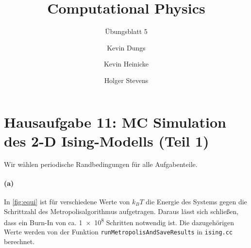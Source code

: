 \documentclass{scrartcl}
\author{Kevin Dungs \and Kevin Heinicke \and Holger Stevens}
\title{Computational Physics}
\subtitle{Übungsblatt 5}
\begin{document}
\maketitle

\section*{Hausaufgabe 11: MC Simulation des 2-D Ising-Modells (Teil 1)}
Wir wählen periodische Randbedingungen für alle Aufgabenteile.

\paragraph{(a)} In \autoref{fig:equi} ist für verschiedene Werte von $k_BT$ die Energie des Systems gegen die Schrittzahl des Metropolisalgorithmus aufgetragen. Daraus lässt sich schließen, dass ein Burn-In von ca. \num{1e8} Schritten notwendig ist. Die dazugehörigen Werte werden von der Funktion \texttt{runMetropolisAndSaveResults} in \texttt{ising.cc} berechnet.
\end{document}
